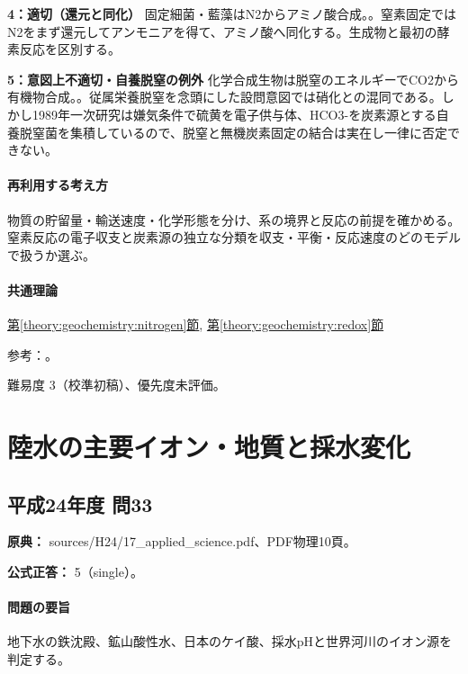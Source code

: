 \noindent\textbf{4：適切（還元と同化）} 固定細菌・藍藻はN2からアミノ酸合成。。窒素固定ではN2をまず還元してアンモニアを得て、アミノ酸へ同化する。生成物と最初の酵素反応を区別する。\par

\noindent\textbf{5：意図上不適切・自養脱窒の例外} 化学合成生物は脱窒のエネルギーでCO2から有機物合成。。従属栄養脱窒を念頭にした設問意図では硝化との混同である。しかし1989年一次研究は嫌気条件で硫黄を電子供与体、HCO3-を炭素源とする自養脱窒菌を集積しているので、脱窒と無機炭素固定の結合は実在し一律に否定できない。\par

\paragraph{再利用する考え方} 物質の貯留量・輸送速度・化学形態を分け、系の境界と反応の前提を確かめる。窒素反応の電子収支と炭素源の独立な分類を収支・平衡・反応速度のどのモデルで扱うか選ぶ。

\paragraph{共通理論} \hyperref[theory:geochemistry:nitrogen]{第\ref*{theory:geochemistry:nitrogen}節}, \hyperref[theory:geochemistry:redox]{第\ref*{theory:geochemistry:redox}節}

\par 参考：\cite{gc_sulfur_denit,gc_redox,gc_hem}。

\par 難易度 3（校準初稿）、優先度未評価。

\section{陸水の主要イオン・地質と採水変化}

\subsection{平成24年度 問33}
\label{q:h24-reg-applied-33}

\noindent\textbf{原典：} sources/H24/17\_applied\_science.pdf、PDF物理10頁。

\textbf{公式正答：} 5（single）。

\paragraph{問題の要旨} 地下水の鉄沈殿、鉱山酸性水、日本のケイ酸、採水pHと世界河川のイオン源を判定する。

